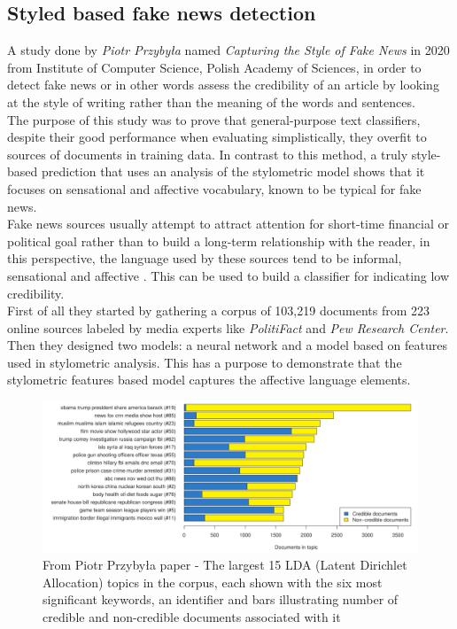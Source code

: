 \documentclass[10pt, english]{report}
\begin{document}
\subsection{Styled based fake news detection \cite{przybyla2020capturing}}
A study done by \textit{Piotr Przybyła} named \textit{Capturing the Style of Fake News} in 2020 from Institute of Computer Science, Polish Academy of Sciences, in order to detect fake news or in other words assess the credibility of an article by looking at the style of writing rather than the meaning of the words and sentences.\\
The purpose of this study was to prove that general-purpose text classifiers, despite their good performance when evaluating simplistically, they overfit to sources of documents in training data. In contrast to this method, a truly style-based prediction that uses an analysis of the stylometric model shows that it focuses on sensational and affective vocabulary, known to be typical for fake news.\\

Fake news sources usually attempt to attract attention for short-time financial or political goal \cite{allcott2017social} rather than to build a long-term relationship with the reader, in this perspective, the language used by these sources tend to be informal, sensational and affective \cite{bakir2017fake}. This can be used to build a classifier for indicating low credibility.\\

First of all they started by gathering a corpus of 103,219 documents from 223 online sources labeled by media experts like \textit{PolitiFact} and \textit{Pew Research Center}. Then they designed two models: a neural network and a model based on features used in stylometric analysis. This has a purpose to demonstrate that the stylometric features based model captures the affective language elements.\\

\begin{figure}[H]
	\centering
	\includegraphics[scale=0.4]{img/documents_in_topic.png}
	\caption{From Piotr Przybyła paper - The largest 15 LDA (Latent Dirichlet Allocation) topics in the corpus, each shown with the six most signiﬁcant keywords, an identiﬁer and bars illustrating number of credible and non-credible documents associated with it}
\end{figure}
\end{document}
